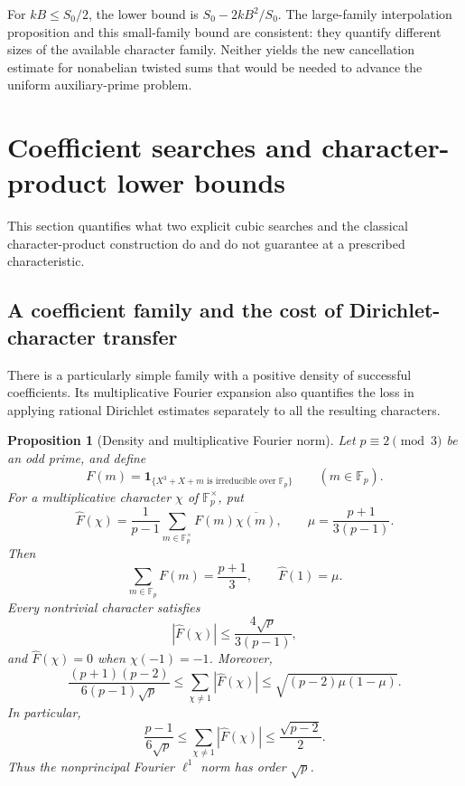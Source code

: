 \documentclass[11pt]{article}
\newtheorem{proposition}[theorem]{Proposition}
\theoremstyle{definition}
\theoremstyle{remark}
\begin{document}
For \(kB\leq S_0/2\), the lower bound is
\(S_0-2kB^2/S_0\). The large-family interpolation proposition
and this small-family bound are consistent: they quantify different
sizes of the available character family. Neither yields the new
cancellation estimate for nonabelian twisted sums that would be
needed to advance the uniform auxiliary-prime problem.


\section{Coefficient searches and character-product lower bounds}
This section quantifies what two explicit cubic searches and the classical character-product construction do and do not guarantee at a prescribed characteristic.

\subsection{A coefficient family and the cost of Dirichlet-character transfer}
\label{subsec:cubic-fourier-transfer}

There is a particularly simple family with a positive density of
successful coefficients.  Its multiplicative Fourier expansion also
quantifies the loss in applying rational Dirichlet estimates separately
to all the resulting characters.

\begin{proposition}[Density and multiplicative Fourier norm]
\label{prop:cubic-fourier-norm}
Let $p\equiv2\pmod3$ be an odd prime, and define
\[
 F(m)=\boldsymbol 1_{\{X^3+X+m\text{ is irreducible over }\mathbb F_p\}}
 \qquad(m\in\mathbb F_p).
\]
For a multiplicative character $\chi$ of $\mathbb F_p^\times$, put
\[
 \widehat F(\chi)=\frac1{p-1}
    \sum_{m\in\mathbb F_p^\times}F(m)\overline{\chi(m)},
 \qquad
 \mu=\frac{p+1}{3(p-1)}.
\]
Then
\[
 \sum_{m\in\mathbb F_p}F(m)=\frac{p+1}{3},
 \qquad \widehat F(1)=\mu.
\]
Every nontrivial character satisfies
\[
 |\widehat F(\chi)|\le\frac{4\sqrt p}{3(p-1)},
\]
and $\widehat F(\chi)=0$ when $\chi(-1)=-1$.
Moreover,
\[
 \frac{(p+1)(p-2)}{6(p-1)\sqrt p}
 \le \sum_{\chi\ne1}|\widehat F(\chi)|
 \le \sqrt{(p-2)\mu(1-\mu)}.
\]
In particular,
\[
 \frac{p-1}{6\sqrt p}
 \le \sum_{\chi\ne1}|\widehat F(\chi)|
 \le \frac{\sqrt{p-2}}2.
\]
Thus the nonprincipal Fourier $\ell^1$ norm has order $\sqrt p$.
\end{proposition}
\end{document}
